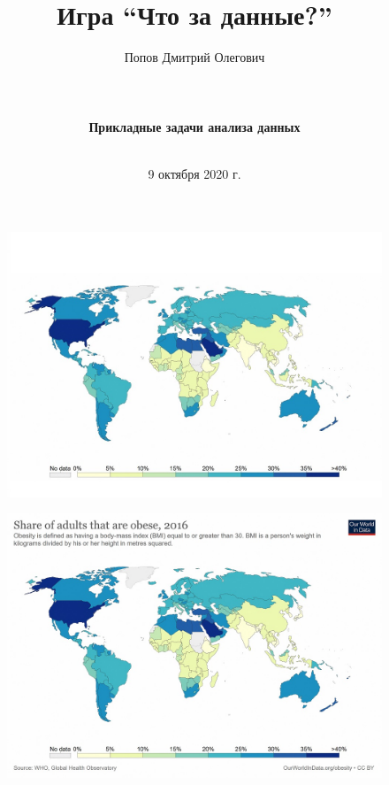\documentclass{beamer}
\title[Что за данные?]{Игра ``Что за данные?''} %
\author[Попов Дмитрий]{Попов Дмитрий Олегович\\
	~\\
	~\\
	~\\
	\textbf {Прикладные задачи анализа данных}\\
	~\\} %
{
\medskip
}
\date{9 октября 2020 г.} %
\begin{document}
\begin{frame}
\titlepage %
\end{frame}


\begin{frame}

\begin{figure}
	\centering
	\includegraphics[width=120mm]{obese1.jpg}
\end{figure}


\end{frame}

\begin{frame}

\begin{figure}
	\centering
	\includegraphics[width=120mm]{obese2.jpg}
\end{figure}

\end{frame}
\end{document}
